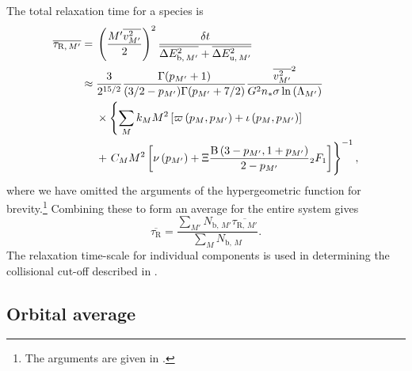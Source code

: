 The total relaxation time for a species is
\begin{align}
\overline{\tau_{\mathrm{R,}\,M'}} = {} & \left(\dfrac{{M'}\overline{v_{M'}^2}}{2}\right)^2\dfrac{\delta t}{\overline{\Delta E^2_{\mathrm{b},\,M'}} + \overline{\Delta E^2_{\mathrm{u},\,M'}}} \\
 \approx {} & \dfrac{3}{2^{15/2}}\dfrac{\Gamma(p_{M'} + 1)}{(3/2 - p_{M'})\Gamma(p_{M'} + 7/2)}\dfrac{\overline{v_{M'}^2}^2}{G^2n_\ast\sigma\ln\left(\Lambda_{M'}\right)} \nonumber \\* 
 {} & \times \left\{\sum_M k_M M^2 \left[ \varpi\left(p_M,p_{M'}\right) + \iota \left(p_M,p_{M'}\right)\right] \right. \nonumber \\*
 {} & + \left. \vphantom{ \left[ \dfrac{p_{M'}^2\left(6 + 9p_M + 8p_M^2\right)}{210}\right]} C_M M^2 \left[\nu\left(p_{M'}\right) + \Xi\dfrac{\Beta\left(3-p_{M'},1+p_{M'}\right)}{2-p_{M'}}{_2F_1}%
 \right]\right\}^{-1},
\end{align}
where we have omitted the arguments of the hypergeometric function for brevity.\footnote{The arguments are given in .} Combining these to form an average for the entire system gives
\begin{equation}
\overline{\tau_{\mathrm{R}}} = \dfrac{\sum_{M'}N_{\mathrm{b,}\,M'}\overline{\tau_{\mathrm{R,}\,M'}}}{\sum_{M}N_{\mathrm{b,}\,M}}.
\label{eq:system-relax}
\end{equation}
The relaxation time-scale for individual components is used in determining the collisional cut-off described in .

\subsection{Orbital average}\label{sec:orbital-ave}

